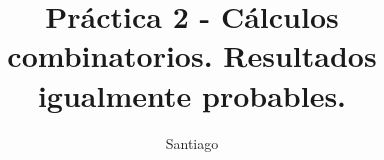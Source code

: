 \documentclass{article}
\title{Práctica 2 - Cálculos combinatorios. Resultados igualmente probables.}
\author{Santiago}
\date{}
\begin{document}
    \maketitle
    \begin{enumerate}
        
        
        
        
        
        
        
        
        
        
        
        
        
        
        
        
        
        
        
    \end{enumerate}
\end{document}
